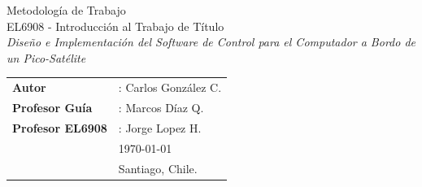 \documentclass[11pt,letterpaper]{article}
\begin{document}
\newpage
\pagestyle{fancy}
\fancyhf{}
\vspace*{6cm}
\begin{center}
\Huge  {Metodología de Trabajo} \\
\vspace{1cm}
\huge {EL6908 - Introducción al Trabajo de Título}\\
\vspace{1cm}
\huge {\textit{Diseño e Implementación del Software de Control para el Computador a Bordo de un Pico-Satélite}}\\
\end{center}
\vfill
\begin{flushright}
\begin{tabular}{ll}
\textbf{Autor} &: Carlos González C.\\
\textbf{Profesor Guía} &: Marcos Díaz Q.\\
\textbf{Profesor EL6908} &: Jorge Lopez H.\\
& \today\\
& Santiago, Chile.
\end{tabular}
\end{flushright}

\newpage
\pagestyle{fancy}
\fancyhf{}
\fancyhead[R]{\small \rm \textbf{\thepage}}
\renewcommand{\sectionmark}[1]{\markright{\thesection.\ #1}}
\renewcommand{\headrulewidth}{0.5pt}
\renewcommand{\footrulewidth}{0.5pt}


\tableofcontents
\listoffigures
\end{document}
